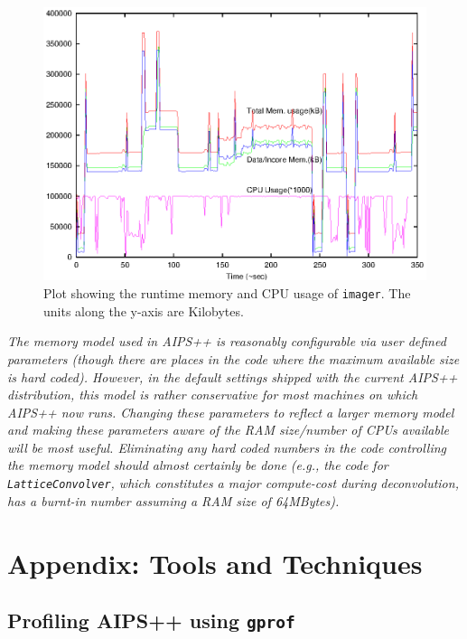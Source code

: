 \begin{figure}[h!]
\begin{center}
  \includegraphics[scale=0.9]{mem_cpu_usage.ps}
\caption[Runtime memory and CPU usage of {\tt imager}.]{\small Plot showing
the runtime memory and CPU usage of {\tt imager}.  The units along the
y-axis are Kilobytes.}
\label{MEM_CPU_USAGE}
\end{center}
\end{figure}

{\it The memory model used in AIPS++ is reasonably configurable via
user defined parameters (though there are places in the code where the
maximum available size is hard coded).  However, in the default
settings shipped with the current AIPS++ distribution, this model is
rather conservative for most machines on which AIPS++ now runs.
Changing these parameters to reflect a larger memory model and making
these parameters aware of the RAM size/number of CPUs available will
be most useful.  Eliminating any hard coded numbers in the code
controlling the memory model should almost certainly be done (e.g.,
the code for {\tt LatticeConvolver}, which constitutes a major
compute-cost during deconvolution, has a burnt-in number assuming a
RAM size of 64MBytes).}

\section{Appendix: Tools and Techniques}
\subsection{Profiling AIPS++ using {\tt gprof}}
\label{A:GPROF}

